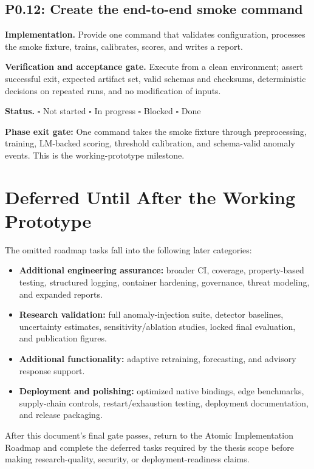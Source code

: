 \documentclass[11pt,a4paper]{article}
\newcommand{\status}{\(\square\) Not started \quad \(\square\) In progress \quad
  \(\square\) Blocked \quad \(\square\) Done}
\newcommand{\task}[4]{%
  \subsection{#1: #2}
  \textbf{Implementation.} #3

  \textbf{Verification and acceptance gate.} #4

  \textbf{Status.} \status
}
\newcommand{\gate}[1]{\textcolor{blue!45!black}{\textbf{Phase exit gate:} #1}}
\begin{document}
\task{P0.12}{Create the end-to-end smoke command}{Provide one command that
validates configuration, processes the smoke fixture, trains, calibrates,
scores, and writes a report.}{Execute from a clean environment; assert
successful exit, expected artifact set, valid schemas and checksums,
deterministic decisions on repeated runs, and no modification of inputs.}

\gate{One command takes the smoke fixture through preprocessing, training,
LM-backed scoring, threshold calibration, and schema-valid anomaly events. This
is the working-prototype milestone.}

\section{Deferred Until After the Working Prototype}

The omitted roadmap tasks fall into the following later categories:
\begin{itemize}
  \item \textbf{Additional engineering assurance:} broader CI, coverage,
  property-based testing, structured logging, container hardening, governance,
  threat modeling, and expanded reports.
  \item \textbf{Research validation:} full anomaly-injection suite, detector
  baselines, uncertainty estimates, sensitivity/ablation studies, locked final
  evaluation, and publication figures.
  \item \textbf{Additional functionality:} adaptive retraining, forecasting,
  and advisory response support.
  \item \textbf{Deployment and polishing:} optimized native bindings, edge
  benchmarks, supply-chain controls, restart/exhaustion testing, deployment
  documentation, and release packaging.
\end{itemize}

After this document's final gate passes, return to the Atomic Implementation
Roadmap and complete the deferred tasks required by the thesis scope before
making research-quality, security, or deployment-readiness claims.
\end{document}
